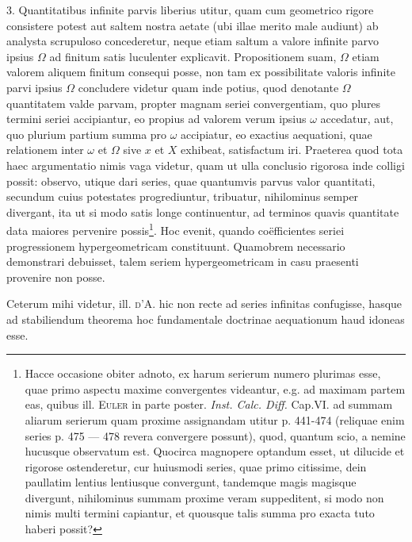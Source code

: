 \documentclass[twoside,12pt, showframe]{memoir}
\begin{document}
3. Quantitatibus infinite parvis liberius utitur, quam cum geometrico rigore consistere potest aut saltem nostra aetate (ubi illae merito male audiunt) ab analysta scrupuloso concederetur, neque etiam saltum a valore infinite parvo ipsius \(\Omega\) ad finitum satis luculenter explicavit. Propositionem suam, \(\Omega\) etiam valorem aliquem finitum consequi posse, non tam ex possibilitate valoris infinite parvi ipsius \(\Omega\) concludere videtur quam inde potius, quod denotante \(\Omega\) quantitatem valde parvam, propter magnam seriei convergentiam, quo plures termini seriei accipiantur, eo propius ad valorem verum ipsius \(\omega\) accedatur, aut, quo plurium partium summa pro \(\omega\) accipiatur, eo exactius aequationi, quae relationem inter \(\omega\) et \(\Omega\) sive \(x\) et \(X\) exhibeat, satisfactum iri. Praeterea quod tota haec argumentatio nimis vaga videtur, quam ut ulla conclusio rigorosa inde colligi possit: observo, utique dari series, quae quantumvis parvus valor quantitati, secundum cuius potestates progrediuntur, tribuatur, nihilominus semper divergant, ita ut si modo satis longe continuentur, ad terminos quavis quantitate data maiores pervenire possis\footnote{Hacce occasione obiter adnoto, ex harum serierum numero plurimas esse, quae primo aspectu maxime convergentes videantur, e.g. ad maximam partem eas, quibus ill. \textsc{Euler} in parte poster. \textit{Inst. Calc. Diff.} Cap.VI. ad summam aliarum serierum quam proxime assignandam utitur p. 441-474 (reliquae enim series p. 475 — 478 revera convergere possunt), quod, quantum scio, a nemine hucusque observatum est. Quocirca magnopere optandum esset, ut dilucide et rigorose ostenderetur, cur huiusmodi series, quae primo citissime, dein paullatim lentius lentiusque convergunt, tandemque magis magisque divergunt, nihilominus summam proxime veram suppeditent, si modo non nimis multi termini capiantur, et quousque talis summa pro exacta tuto haberi possit?}. Hoc evenit, quando co\"efficientes seriei progressionem hypergeometricam constituunt. Quamobrem necessario demonstrari debuisset, talem seriem hypergeometricam in casu praesenti provenire non posse.

Ceterum mihi videtur, ill. \textsc{d'A.} hic non recte ad series infinitas confugisse, hasque ad stabiliendum theorema hoc fundamentale doctrinae aequationum haud idoneas esse.
\end{document}
